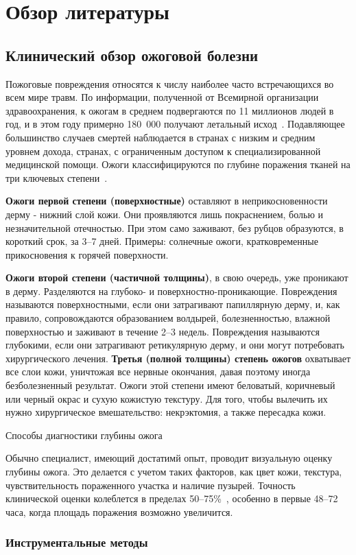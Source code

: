 \chapter{Обзор литературы}
\label{chap:literature}
\setlength{\parskip}{0.8em}
\section{Клинический обзор ожоговой болезни}
Пожоговые повреждения относятся к числу наиболее часто встречающихся во всем мире травм. По информации, полученной от Всемирной организации здравоохранения, к ожогам в среднем подвергаются по 11 миллионов людей в год, и в этом году примерно 180~000 получают летальный исход~\cite{who2018burns}. Подавляющее большинство случаев смертей наблюдается в странах с низким и средним уровнем дохода, странах, с ограниченным доступом к специализированной медицинской помощи. Ожоги классифицируются по глубине поражения тканей на три ключевых степени~\cite{peck2012burns}.

\textbf{Ожоги первой степени (поверхностные)} оставляют в неприкосновенности дерму - нижний слой кожи. Они проявляются лишь покраснением, болью и незначительной отечностью. При этом само заживают, без рубцов образуются, в короткий срок, за 3--7 дней. Примеры: солнечные ожоги, кратковременные прикосновения к горячей поверхности.

\textbf{Ожоги второй степени (частичной толщины)}, в свою очередь, уже проникают в дерму. Разделяются на глубоко- и поверхностно-проникающие. Повреждения называются поверхностными, если они затрагивают папиллярную дерму, и, как правило, сопровождаются образованием волдырей, болезненностью, влажной поверхностью и заживают в течение 2--3 недель. Повреждения называются глубокими, если они затрагивают ретикулярную дерму, и они могут потребовать хирургического лечения. \textbf{Третья (полной толщины) степень ожогов} охватывает все слои кожи, уничтожая все нервные окончания, давая поэтому иногда безболезненный результат. Ожоги этой степени имеют беловатый, коричневый или черный окрас и сухую кожистую текстуру. Для того, чтобы вылечить их нужно хирургическое вмешательство: некрэктомия, а также пересадка кожи.

Способы диагностики глубины ожога

Обычно специалист, имеющий достатимй опыт, проводит визуальную оценку глубины ожога. Это делается с учетом таких факторов, как цвет кожи, текстура, чувствительность пораженного участка и наличие пузырей. Точность клинической оценки колеблется в пределах 50--75\%~\cite{monstrey2008assessment}, особенно в первые 48--72 часа, когда площадь поражения возможно увеличится. \subsection{Инструментальные методы}

